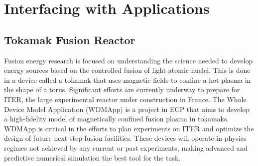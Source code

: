 \section{Interfacing with Applications}


\subsection{Tokamak Fusion Reactor}


Fusion energy research is focused on understanding the science needed to develop energy sources based on the controlled fusion of light atomic nuclei. This is done in a device called a tokamak that uses magnetic fields to confine a hot plasma in the shape of a torus.
Significant efforts are currently underway to prepare for ITER, the large experimental reactor under construction in France.
The Whole Device Model Application (WDMApp) is a project in ECP that aims to develop a high-fidelity model of magnetically confined fusion plasma in tokamaks. 
WDMApp is critical in the efforts to plan experiments on ITER and optimize the design of future next-step fusion facilities. These devices will operate in physics regimes not achieved by any current or past experiments, making advanced and predictive numerical simulation the best tool for the task.




